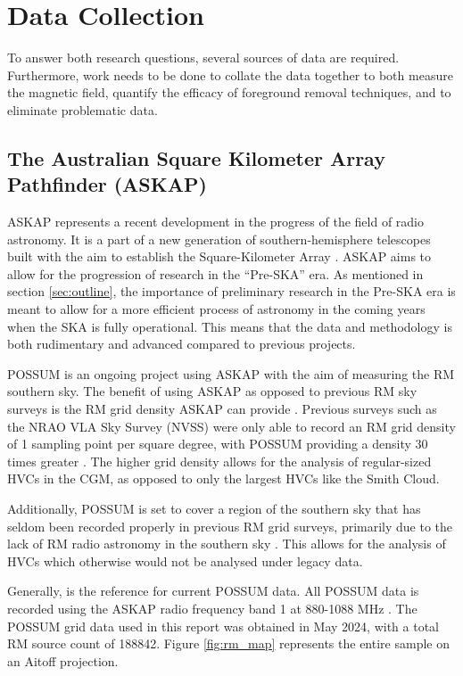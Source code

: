 \chapter{Data Collection}
\label{cha:data}

To answer both research questions, several sources of data are required. Furthermore, work needs to be done to collate the data together to both measure the magnetic field, quantify the efficacy of foreground removal techniques, and to eliminate problematic data.

\section{The Australian Square Kilometer Array Pathfinder (ASKAP)}
\label{sec:ASKAP}

ASKAP represents a recent development in the progress of the field of radio astronomy. It is a part of a new generation of southern-hemisphere telescopes built with the aim to establish the Square-Kilometer Array \citep{ID61, ID52}. ASKAP aims to allow for the progression of research in the “Pre-SKA” era. As mentioned in section \ref{sec:outline}, the importance of preliminary research in the Pre-SKA era is meant to allow for a more efficient process of astronomy in the coming years when the SKA is fully operational. This means that the data and methodology is both rudimentary and advanced compared to previous projects.


POSSUM is an ongoing project using ASKAP with the aim of measuring the RM southern sky. The benefit of using ASKAP as opposed to previous RM sky surveys is the RM grid density ASKAP can provide \citep{ID52, ID61}. Previous surveys such as the NRAO VLA Sky Survey (NVSS) were only able to record an RM grid density of 1 sampling point per square degree, with POSSUM providing a density 30 times greater \citep{ID1, ID52, ID61, ID18}. The higher grid density allows for the analysis of regular-sized HVCs in the CGM, as opposed to only the largest HVCs like the Smith Cloud.


Additionally, POSSUM is set to cover a region of the southern sky that has seldom been recorded properly in previous RM grid surveys, primarily due to the lack of RM radio astronomy in the southern sky \citep{ID44, ID45, ID52}. This allows for the analysis of HVCs which otherwise would not be analysed under legacy data.


Generally, \cite{ID52} is the reference for current POSSUM data. All POSSUM data is recorded using the ASKAP radio frequency band 1 at 880-1088 MHz \citep{ID1, ID52}. The POSSUM grid data used in this report was obtained in May 2024, with a total RM source count of 188842. Figure \ref{fig:rm_map} represents the entire sample on an Aitoff projection.

